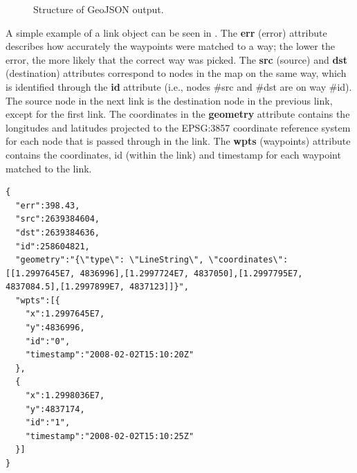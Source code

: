 \begin{figure}[H]
	\centering
	\caption{Structure of GeoJSON output.}
	\label{fig:geojson}
\end{figure}

A simple example of a link object can be seen in . The \textbf{err} (error) attribute describes how accurately the waypoints were matched to a way; the lower the error, the more likely that the correct way was picked. The \textbf{src} (source) and \textbf{dst} (destination) attributes correspond to nodes in the map on the same way, which is identified through the \textbf{id} attribute (i.e., nodes \#src and \#dst are on way \#id). The source node in the next link is the destination node in the previous link, except for the first link. The coordinates in the \textbf{geometry} attribute contains the longitudes and latitudes projected to the EPSG:3857 coordinate reference system for each node that is passed through in the link. The \textbf{wpts} (waypoints) attribute contains the coordinates, id (within the link) and timestamp for each waypoint matched to the link.

\begin{lstlisting}[style=java, caption=Content of a simple link object., label=lst:geojson:link]
{
  "err":398.43,
  "src":2639384604,
  "dst":2639384636,
  "id":258604821,
  "geometry":"{\"type\": \"LineString\", \"coordinates\": [[1.2997645E7, 4836996],[1.2997724E7, 4837050],[1.2997795E7, 4837084.5],[1.2997899E7, 4837123]]}",
  "wpts":[{
    "x":1.2997645E7,
    "y":4836996,
    "id":"0",
    "timestamp":"2008-02-02T15:10:20Z"
  },
  {
    "x":1.2998036E7,
    "y":4837174,
    "id":"1",
    "timestamp":"2008-02-02T15:10:25Z"
  }]
}
\end{lstlisting}
